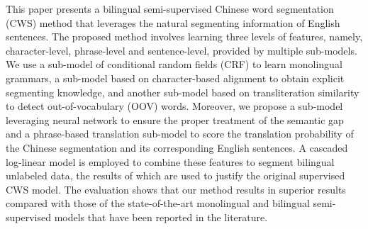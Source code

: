 This paper presents a bilingual semi-supervised Chinese word segmentation (CWS) method that leverages the natural segmenting information of English sentences. The proposed method involves learning three levels of features, namely, character-level, phrase-level and sentence-level, provided by multiple sub-models. We use a sub-model of conditional random fields (CRF) to learn monolingual grammars, a sub-model based on character-based alignment to obtain explicit segmenting knowledge, and another sub-model based on transliteration similarity to detect out-of-vocabulary (OOV) words. Moreover, we propose a sub-model leveraging neural network to ensure the proper treatment of the semantic gap and a phrase-based translation sub-model to score the translation probability of the Chinese segmentation and its corresponding English sentences. A cascaded log-linear model is employed to combine these features to segment bilingual unlabeled data, the results of which are used to justify the original supervised CWS model. The evaluation shows that our method results in superior results compared with those of the state-of-the-art monolingual and bilingual semi-supervised models that have been reported in the literature.
